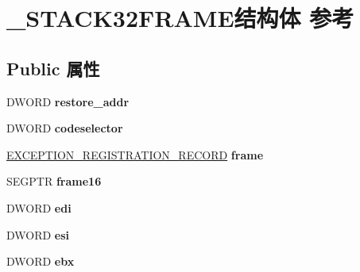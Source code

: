 \hypertarget{struct___s_t_a_c_k32_f_r_a_m_e}{}\section{\+\_\+\+S\+T\+A\+C\+K32\+F\+R\+A\+M\+E结构体 参考}
\label{struct___s_t_a_c_k32_f_r_a_m_e}
\subsection*{Public 属性}
\begin{DoxyCompactItemize}
\item 
\mbox{\label{struct___s_t_a_c_k32_f_r_a_m_e_af3e2e66c5314acaceaab4ee40655660d}} 
D\+W\+O\+RD {\bfseries restore\+\_\+addr}
\item 
\mbox{\label{struct___s_t_a_c_k32_f_r_a_m_e_af8df7cfc3a1f6ebd1764e8cafba0bf61}} 
D\+W\+O\+RD {\bfseries codeselector}
\item 
\mbox{\label{struct___s_t_a_c_k32_f_r_a_m_e_a17b36e1a6c5fbfe0b4bcd94ac08984e7}} 
\hyperlink{struct___e_x_c_e_p_t_i_o_n___r_e_g_i_s_t_r_a_t_i_o_n___r_e_c_o_r_d}{E\+X\+C\+E\+P\+T\+I\+O\+N\+\_\+\+R\+E\+G\+I\+S\+T\+R\+A\+T\+I\+O\+N\+\_\+\+R\+E\+C\+O\+RD} {\bfseries frame}
\item 
\mbox{\label{struct___s_t_a_c_k32_f_r_a_m_e_abdefc185e9482e65f56f932c66b4c945}} 
S\+E\+G\+P\+TR {\bfseries frame16}
\item 
\mbox{\label{struct___s_t_a_c_k32_f_r_a_m_e_a2c6e3dd34245f61b67152d81ce495ff0}} 
D\+W\+O\+RD {\bfseries edi}
\item 
\mbox{\label{struct___s_t_a_c_k32_f_r_a_m_e_afbdf9f12138ce988f3a386722e632494}} 
D\+W\+O\+RD {\bfseries esi}
\item 
\mbox{\label{struct___s_t_a_c_k32_f_r_a_m_e_a67850af2629e22b3e3eb38315750e691}} 
D\+W\+O\+RD {\bfseries ebx}
\item 
\mbox{\label{struct___s_t_a_c_k32_f_r_a_m_e_a976574c128439d229cb43d395854b3ff}} 

\end{DoxyCompactItemize}
